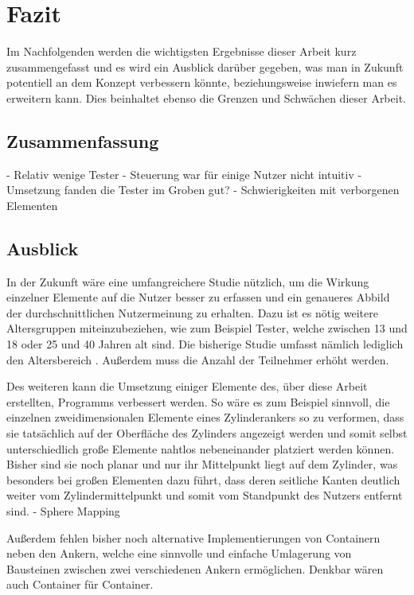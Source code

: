 
\chapter{Fazit}\label{chapter:conclusion}

	Im Nachfolgenden werden die wichtigsten Ergebnisse dieser Arbeit kurz zusammengefasst und es wird ein Ausblick darüber gegeben, was man in Zukunft potentiell an dem Konzept verbessern könnte, beziehungsweise inwiefern man es erweitern kann. Dies beinhaltet ebenso die Grenzen und Schwächen dieser Arbeit.

	\section{Zusammenfassung}
		- Relativ wenige Tester
		- Steuerung war für einige Nutzer nicht intuitiv
		- Umsetzung fanden die Tester im Groben gut?
		- Schwierigkeiten mit verborgenen Elementen
	
	\section{Ausblick}
		
		In der Zukunft wäre eine umfangreichere Studie nützlich, um die Wirkung einzelner Elemente auf die Nutzer besser zu erfassen und ein genaueres Abbild der durchschnittlichen Nutzermeinung zu erhalten. Dazu ist es nötig weitere Altersgruppen miteinzubeziehen, wie zum Beispiel Tester, welche zwischen 13 und 18 oder 25 und 40 Jahren alt sind. Die bisherige Studie umfasst nämlich lediglich den Altersbereich . Außerdem muss die Anzahl der Teilnehmer erhöht werden.
		
		
		Des weiteren kann die Umsetzung einiger Elemente des, über diese Arbeit erstellten, Programms verbessert werden. So wäre es zum Beispiel sinnvoll, die einzelnen zweidimensionalen Elemente  eines Zylinderankers so zu verformen, dass sie tatsächlich auf der Oberfläche des Zylinders angezeigt werden und somit selbst unterschiedlich große Elemente nahtlos nebeneinander platziert werden können. Bisher sind sie noch planar und nur ihr Mittelpunkt  liegt auf dem Zylinder, was besonders bei großen Elementen dazu führt, dass deren seitliche Kanten deutlich weiter vom Zylindermittelpunkt und somit vom Standpunkt des Nutzers entfernt sind.
		- Sphere Mapping
		
		
		Außerdem fehlen bisher noch alternative Implementierungen von Containern neben den Ankern, welche eine sinnvolle und einfache Umlagerung von Bausteinen zwischen zwei verschiedenen Ankern ermöglichen. Denkbar wären auch Container für Container.
				
